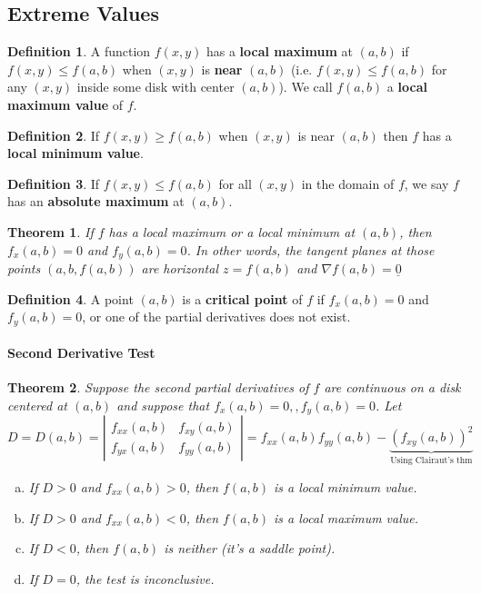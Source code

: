 \documentclass[12 pt]{article}
\newtheorem{thm}{Theorem}
\theoremstyle{definition}
\newtheorem{defn}{Definition}
\begin{document}
\subsection{Extreme Values}
\begin{defn}
  A function $f(x,y)$ has a \textbf{local maximum} at $(a,b)$ if $f(x,y)\leq f(a,b)$ when $(x,y)$ is \textbf{near} $(a,b)$ (i.e. $f(x,y)\leq f(a,b)$ for any $(x,y)$ inside some disk with center $(a,b)$). We call $f(a,b)$ a \textbf{local maximum value} of $f$.
\end{defn}
\begin{defn}
  If $f(x,y) \geq f(a,b)$ when $(x,y)$ is near $(a,b)$ then $f$ has a \textbf{local minimum value}.
\end{defn}
\begin{defn}
  If $f(x,y)\leq f(a,b)$ for all $(x,y)$ in the domain of $f$, we say $f$ has an \textbf{absolute maximum} at $(a,b)$.
\end{defn}
\begin{thm}
  If $f$ has a local maximum or a local minimum at $(a,b)$, then $f_x(a,b)=0$ and $f_y(a,b)=0$. In other words, the tangent planes at those points $(a,b,f(a,b))$ are horizontal $z=f(a,b)$ and $\nabla f(a,b)=\underline{0}$
\end{thm}
\begin{defn}
  A point $(a,b)$ is a \textbf{critical point} of $f$ if $f_x(a,b)=0$ and $f_y(a,b)=0$, or one of the partial derivatives does not exist.
\end{defn}
\paragraph{Second Derivative Test}
\begin{thm}
  Suppose the second partial derivatives of $f$ are continuous on a disk centered at $(a,b)$ and suppose that $f_x(a,b)=0,,f_y(a,b)=0$. Let
  $$ D=D(a,b)=
  \left|\begin{matrix}
      f_{xx}(a,b) & f_{xy}(a,b)
      \\f_{yx}(a,b) & f_{yy}(a,b)
  \end{matrix}\right|=f_{xx}(a,b)f_{yy}(a,b)-\underbrace{(f_{xy}(a,b))^2}_{\text{Using Clairaut's thm}}$$
\begin{enumerate}[a)]
\item If $D>0$ and $f_{xx}(a,b)>0$, then $f(a,b)$ is a local minimum value.
\item If $D>0$ and $f_{xx}(a,b)<0$, then $f(a,b)$ is a local maximum value.
\item If $D<0$, then $f(a,b)$ is neither (it's a saddle point).
  \item If $D=0$, the test is inconclusive.
\end{enumerate}
\end{thm}
\end{document}
